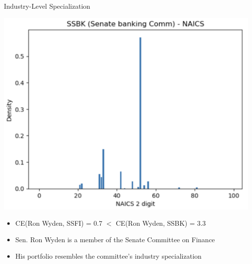 \documentclass{beamer}
\begin{document}
\begin{frame}{Industry-Level Specialization}
\begin{center}
\begin{minipage}{0.3\textwidth}
			\end{minipage}
			\hfill
			\begin{minipage}{0.3\textwidth}
				\centering
				\includegraphics[scale=0.15]{./images/ssbk.png} %
			\end{minipage}
		\end{center}
		\begin{itemize}
			\item CE(Ron Wyden, SSFI) = 0.7 $<$ CE(Ron Wyden, SSBK) = 3.3
			\item Sen. Ron Wyden is a member of the Senate Committee on Finance
			\item His portfolio resembles the committee's industry specialization
		\end{itemize}
	\end{frame}
\end{document}
